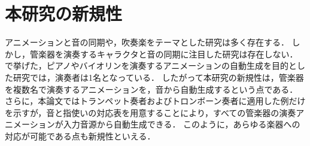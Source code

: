 \section{本研究の新規性}\label{sec:compere}
アニメーションと音の同期や，吹奏楽をテーマとした研究は多く存在する．
しかし，管楽器を演奏するキャラクタと音の同期に注目した研究は存在しない．
で挙げた，ピアノやバイオリンを演奏するアニメーションの自動生成を目的とした研究では，演奏者は1名となっている．
したがって本研究の新規性は，管楽器を複数名で演奏するアニメーションを，音から自動生成するという点である．
さらに，本論文ではトランペット奏者およびトロンボーン奏者に適用した例だけを示すが，音と指使いの対応表を用意することにより，すべての管楽器の演奏アニメーションが入力音源から自動生成できる．
このように，あらゆる楽器への対応が可能である点も新規性といえる．